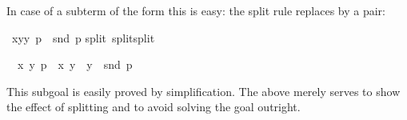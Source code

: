 \begin{isabellebody}
\begin{isamarkuptext}
In case of a subterm of the form  this is easy: the split
rule  replaces  by a pair:%
\end{isamarkuptext}%
\ {\isachardoublequote}{\isacharparenleft}{\isasymlambda}{\isacharparenleft}x{\isacharcomma}y{\isacharparenright}{\isachardot}y{\isacharparenright}\ p\ {\isacharequal}\ snd\ p{\isachardoublequote}\isanewline
{}split\ split{\isacharunderscore}split{\isacharparenright}%
\begin{isamarkuptxt}%
\begin{isabelle}%
\ {}{\isachardot}\ {\isasymforall}x\ y{\isachardot}\ p\ {\isacharequal}\ {\isacharparenleft}x{\isacharcomma}\ y{\isacharparenright}\ {\isasymlongrightarrow}\ y\ {\isacharequal}\ snd\ p%
\end{isabelle}
This subgoal is easily proved by simplification. The  above
merely serves to show the effect of splitting and to avoid solving the goal
outright.


\end{isamarkuptxt}
\end{isabellebody}
